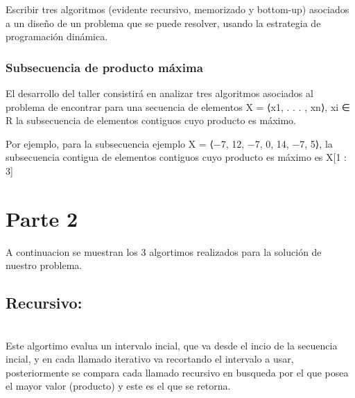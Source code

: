 \documentclass[11pt]{article}
\begin{document}
Escribir tres algoritmos (evidente recursivo, memorizado y bottom-up)
asociados a un diseño de un problema que se puede resolver, usando la
estrategia de programación dinámica.

\hypertarget{subsecuencia-de-producto-muxe1xima}{%
\subsubsection{Subsecuencia de producto
máxima}\label{subsecuencia-de-producto-muxe1xima}}

El desarrollo del taller consistirá en analizar tres algoritmos
asociados al problema de encontrar para una secuencia de elementos X =
⟨x1, . . . , xn⟩, xi ∈ R la subsecuencia de elementos contiguos cuyo
producto es máximo.

Por ejemplo, para la subsecuencia ejemplo X = ⟨−7, 12, −7, 0, 14, −7,
5⟩, la subsecuencia contigua de elementos contiguos cuyo producto es
máximo es X{[}1 : 3{]}

\pagebreak
\hypertarget{parte-2}{%
\section{Parte 2}\label{parte-2}}

A continuacion se muestran los 3 algortimos realizados para la solución
de nuestro problema.

\hypertarget{recursivo}{%
\subsection{Recursivo:}\label{recursivo}}

\\

Este algortimo evalua un intervalo incial, que va desde el incio de la
secuencia incial, y en cada llamado iterativo va recortando el intervalo
a usar, posteriormente se compara cada llamado recursivo en busqueda por
el que posea el mayor valor (producto) y este es el que se retorna.
\end{document}

